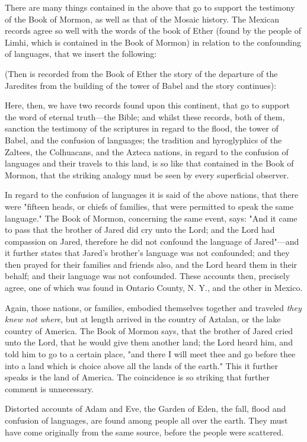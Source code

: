 There are many things contained in the above that go to support the testimony of the Book of
Mormon, as well as that of the Mosaic history. The Mexican records agree so well with the
words of the book of Ether (found by the people of Limhi, which is contained in the Book of
Mormon) in relation to the confounding of languages, that we insert the following:

(Then is recorded from the Book of Ether the story of the departure of the Jaredites from the
building of the tower of Babel and the story continues):

Here, then, we have two records found upon this continent, that go to support the word of
eternal truth—the Bible; and whilst these records, both of them, sanction the testimony of the
scriptures in regard to the flood, the tower of Babel, and the confusion of languages; the
tradition and hyroglyphics of the Zaltees, the Colhuacans, and the Azteca nations, in regard
to the confusion of languages and their travels to this land, is so like that contained in the
Book of Mormon, that the striking analogy must be seen by every superficial observer.

In regard to the confusion of languages it is said of the above nations, that there were "fifteen
heads, or chiefs of families, that were permitted to speak the same language." The Book of
Mormon, concerning the same event, says: "And it came to pass that the brother of Jared did
cry unto the Lord; and the Lord had compassion on Jared, therefore he did not confound the
language of Jared"—and it further states that Jared's brother's language was not confounded;
and they then prayed for their families and friends also, and the Lord heard them in their
behalf; and their language was not confounded. These accounts then, precisely agree, one of
which was found in Ontario County, N. Y., and the other in Mexico.

Again, those nations, or families, embodied themselves together and traveled \textit{they knew not
where}, but at length arrived in the country of Aztalan, or the lake country of America. The
Book of Mormon says, that the brother of Jared cried unto the Lord, that he would give them
another land; the Lord heard him, and told him to go to a certain place, "and there I will meet
thee and go before thee into a land which is choice above all the lands of the earth." This it
further speaks is the land of America. The coincidence is so striking that further comment is
unnecessary.

Distorted accounts of Adam and Eve, the Garden of Eden, the fall, flood and confusion of
languages, are found among people all over the earth. They must have come originally from
the same source, before the people were scattered.

